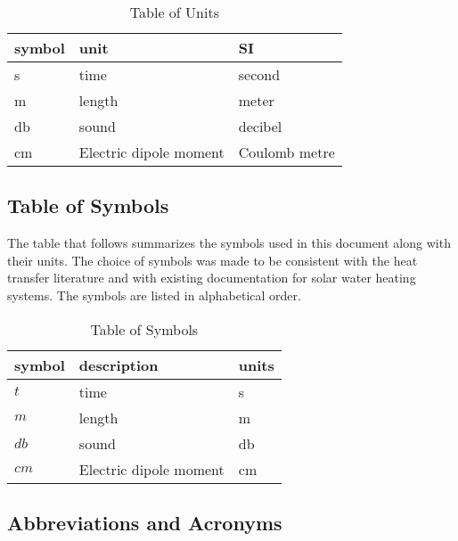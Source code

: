 \documentclass[12pt]{article}
\begin{document}
\renewcommand{\arraystretch}{1.2}
\begin{table}[ht]
\caption{Table of Units}
\begin{tabular}{l l l}
\toprule
\textbf{symbol} & \textbf{unit} & \textbf{SI}\\
\midrule
\si{s} & time & second\\
\si{m} & length & meter\\
\si{db} & sound & decibel\\
\si{cm} & Electric dipole moment & Coulomb metre\\
\bottomrule
\end{tabular}
\end{table}

\subsection{Table of Symbols}

The table that follows summarizes the symbols used in this document along with
their units.  The choice of symbols was made to be consistent with the heat
transfer literature and with existing documentation for solar water heating
systems.  The symbols are listed in alphabetical order.

\renewcommand{\arraystretch}{1.2}
\begin{table}[ht]
\caption{Table of Symbols}
\begin{tabular}{l l l}
\toprule
\textbf{symbol} & \textbf{description} & \textbf{units}\\
\midrule
$t$ & time & \si{s}\\
$m$ & length & \si{m}\\
$db$ & sound & \si{db}\\
$cm$ & Electric dipole moment & \si{cm}\\
\bottomrule
\end{tabular}
\end{table}

\subsection{Abbreviations and Acronyms}
\end{document}
